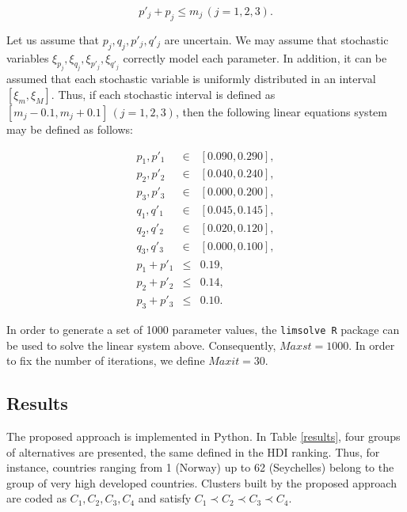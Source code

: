 \documentclass[]{elsarticle}
\theoremstyle{definition}
\begin{document}
\begin{equation}
p'_j+p_j \leq m_j \, (j=1,2,3). \label{thresholds}
\end{equation}



Let us assume that  $p_j,q_j,p'_j,q'_j$ are uncertain.  We may assume that stochastic variables $\xi_{p_j},\xi_{q_j},\xi_{p'_j},\xi_{q'_j}$ correctly model each parameter. In addition, it can be assumed that each stochastic variable is uniformly distributed in an interval  $[\xi_m, \xi_M]$. Thus, if each stochastic interval is defined as $[m_j-0.1, m_j+0.1] \,(j=1,2,3)$, then the following linear equations system may be defined as follows:

\begin{eqnarray}
p_1,p'_1 &\in& [0.090, 0.290], \nonumber\\
p_2,p'_2 &\in& [0.040, 0.240], \nonumber\\
p_3,p'_3 &\in& [0.000, 0.200], \nonumber\\
q_1,q'_1 &\in& [0.045, 0.145], \nonumber\\
q_2,q'_2 &\in& [0.020, 0.120], \nonumber\\
q_3,q'_3 &\in& [0.000, 0.100], \nonumber\\
p_1+p'_1 &\leq& 0.19, \nonumber\\
p_2+p'_2 &\leq& 0.14,  \nonumber\\
p_3+p'_3 &\leq& 0.10. \nonumber
\end{eqnarray}


\noindent
In order to generate a set of 1000 parameter values, the \texttt{limsolve  R} package can be used to solve the linear system above. Consequently, $Maxst=1000$.  In order to fix the number of iterations, we define $Maxit=30$.

\subsection{Results}

The proposed approach is implemented in Python.  In Table \ref{results}, four groups of alternatives  are presented, the same defined in the HDI ranking.  Thus, for instance,  countries ranging from  1 (Norway) up to 62 (Seychelles) belong to the group of very high developed countries. Clusters built by the proposed approach are coded as $C_1, C_2, C_3, C_4$ and satisfy $C_1 \prec  C_2 \prec C_3 \prec C_4$.  
\end{document}
